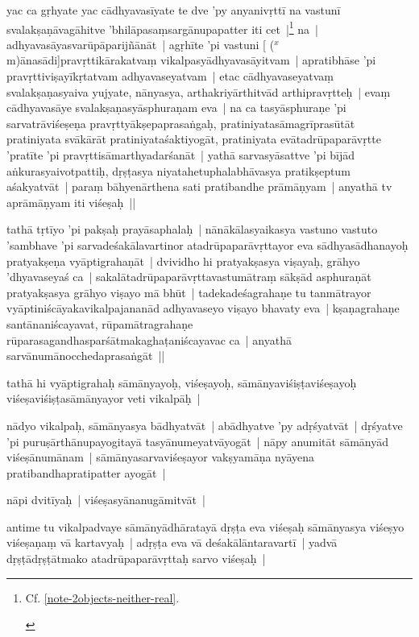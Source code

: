 \documentclass[article,12pt,a4paper]{memoir}
\newcommand{\corr}[1]{($^{x}$#1)}
\begin{document}
	  \pstart yac ca gṛhyate yac cādhyavasīyate te dve 'py anyanivṛttī na vastunī svalakṣaṇāvagāhitve 'bhilāpasaṃsargānupapatter iti cet |\footnote{\label{RNA-n-0}  \begin{english}Cf. \ref{note-2objects-neither-real}.\end{english}} \label{thakur75-73.9} na | adhyavasāyasvarūpāparijñānāt | agṛhīte 'pi vastuni [ {\corr mānasādi}]pravṛttikārakatvaṃ vikalpasyādhyavasāyitvam | apratibhāse 'pi pravṛttiviṣayīkṛtatvam adhyavaseyatvam | etac cādhyavaseyatvaṃ svalakṣaṇasyaiva yujyate, nānyasya, arthakriyārthitvād arthipravṛtteḥ | \label{thakur75-73.12} evaṃ cādhyavasāye svalakṣaṇasyāsphuraṇam eva | na ca tasyāsphuraṇe 'pi sarvatrāviśeṣeṇa pravṛttyākṣepaprasaṅgaḥ, pratiniyatasāmagrīprasūtāt pratiniyata svākārāt pratiniyataśaktiyogāt, pratiniyata evātadrūpaparāvṛtte 'pratīte 'pi pravṛttisāmarthyadarśanāt | yathā sarvasyāsattve 'pi bījād aṅkurasyaivotpattiḥ, dṛṣṭasya niyatahetuphalabhāvasya pratikṣeptum aśakyatvāt | paraṃ bāhyenārthena sati pratibandhe prāmāṇyam | anyathā tv aprāmāṇyam iti viśeṣaḥ ||
	\pend
      

	  \pstart tathā tṛtīyo 'pi pakṣaḥ prayāsaphalaḥ | nānākālasyaikasya vastuno vastuto 'sambhave 'pi sarvadeśakālavartinor atadrūpaparāvṛttayor eva sādhyasādhanayoḥ pratyakṣeṇa vyāptigrahaṇāt | \label{thakur75-73.20} dvividho hi pratyakṣasya viṣayaḥ, grāhyo 'dhyavaseyaś ca | sakalātadrūpaparāvṛttavastumātraṃ sākṣād asphuraṇāt pratyakṣasya grāhyo viṣayo mā bhūt | tadekadeśagrahaṇe tu tanmātrayor vyāptiniścāyakavikalpajananād adhyavaseyo viṣayo bhavaty eva | kṣaṇagrahaṇe santānaniścayavat, rūpamātragrahaṇe rūparasagandhasparśātmakaghaṭaniścayavac ca | anyathā sarvānumānocchedaprasaṅgāt ||
	\pend
      

	  \pstart tathā hi vyāptigrahaḥ sāmānyayoḥ, viśeṣayoḥ, sāmānyaviśiṣṭaviśeṣayoḥ viśeṣaviśiṣṭasāmānyayor veti vikalpāḥ |
	\pend
      

	  \pstart nādyo vikalpaḥ, sāmānyasya bādhyatvāt | abādhyatve 'py adṛśyatvāt | dṛśyatve 'pi puruṣārthānupayogitayā tasyānumeyatvāyogāt | nāpy anumitāt sāmānyād viśeṣānumānam | sāmānyasarvaviśeṣayor vakṣyamāṇa nyāyena pratibandhapratipatter ayogāt |
	\pend
      

	  \pstart nāpi dvitīyaḥ | viśeṣasyānanugāmitvāt |
	\pend
      

	  \pstart antime tu vikalpadvaye sāmānyādhāratayā dṛṣṭa eva viśeṣaḥ sāmānyasya viśeṣyo viśeṣaṇaṃ vā kartavyaḥ | adṛṣṭa eva vā deśakālāntaravartī | yadvā dṛṣṭādṛṣṭātmako atadrūpaparāvṛttaḥ sarvo viśeṣaḥ | 
	\pend
      
\end{document}
